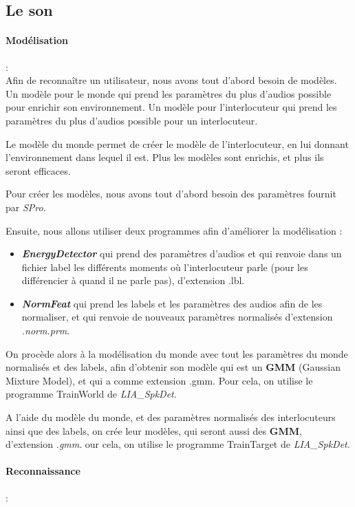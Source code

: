 \subsection{Le son}
\label{subsec:son}


\paragraph*{Modélisation} : \\

Afin de reconnaître un utilisateur, nous avons tout d'abord besoin de modèles.
Un modèle pour le monde qui prend les paramètres du plus d'audios possible pour enrichir son environnement.
Un modèle pour l'interlocuteur qui prend les paramètres du plus d'audios possible pour un interlocuteur.

Le modèle du monde permet de créer le modèle de l'interlocuteur, en lui donnant l'environnement dans lequel il est.
Plus les modèles sont enrichis, et plus ils seront efficaces.

Pour créer les modèles, nous avons tout d'abord besoin des paramètres fournit par \textit{SPro}.

Ensuite, nous allons utiliser deux programmes afin d'améliorer la modélisation :
\begin{itemize}
    \item  \textit{\textbf{EnergyDetector}} qui prend des paramètres d'audios et qui renvoie dans un fichier label les différents moments où
          l'interlocuteur parle (pour les différencier à quand il ne parle pas), d'extension .lbl.
    \item\textit{\textbf{ NormFeat }} qui prend les labels et les paramètres des audios afin de les normaliser, et qui renvoie de
          nouveaux paramètres normalisés d'extension \textit{.norm.prm}.
\end{itemize}


On procède alors à la modélisation du monde avec tout les paramètres du monde normalisés et des labels, afin d'obtenir son modèle qui est un \textbf{GMM}
(Gaussian Mixture Model), et qui a comme extension .gmm.
Pour cela, on utilise le programme TrainWorld de \textit{  LIA\_SpkDet}.

A l'aide du modèle du monde, et des paramètres normalisés des interlocuteurs ainsi que des labels, on crée leur modèles, qui seront aussi des \textbf{GMM},
d'extension \textit{.gmm}.
our cela, on utilise le programme TrainTarget de \textit{ LIA\_SpkDet}.


\paragraph*{Reconnaissance} : \\


